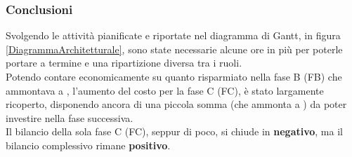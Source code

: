 	\subsubsection{Conclusioni}
	\label{CCPA}
Svolgendo le attività pianificate e riportate nel diagramma di Gantt\glossario{}, in figura \ref{DiagrammaArchitetturale}, sono state necessarie alcune ore in più per poterle portare a termine e una ripartizione diversa tra i ruoli.\\
Potendo contare economicamente su quanto risparmiato nella fase B (FB) che ammontava a , l'aumento del costo per la fase C (FC), è stato largamente ricoperto, disponendo ancora di una piccola somma (che ammonta a ) da poter investire nella fase successiva. \\
Il bilancio della sola fase C (FC), seppur di poco, si chiude in \textbf{negativo}, ma il bilancio complessivo rimane \textbf{positivo}.
\pagebreak
